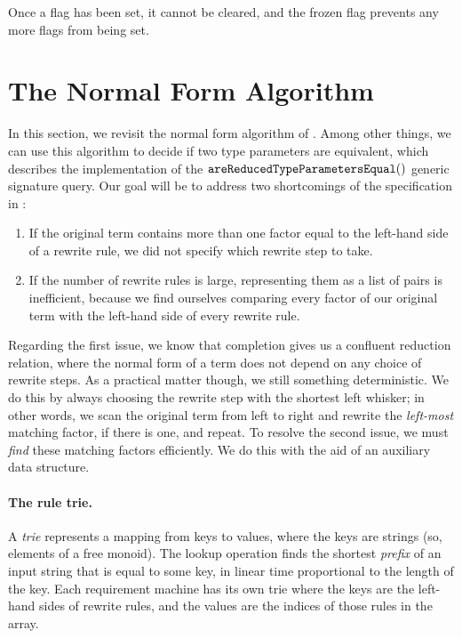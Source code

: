 \documentclass[../generics]{subfiles}
\begin{document}
Once a flag has been set, it cannot be cleared, and the frozen flag prevents any more flags from being set.

\section{The Normal Form Algorithm}\label{sec:rqm normal form}

In this section, we revisit the normal form algorithm of . Among other things, we can use this algorithm to decide if two type parameters are equivalent, which describes the implementation of the $\texttt{areReducedTypeParametersEqual}()$ generic signature query. Our goal will be to address two shortcomings of the specification in :
\begin{enumerate}
\item If the original term contains more than one factor equal to the left-hand side of a rewrite rule, we did not specify which rewrite step to take.

\item If the number of rewrite rules is large, representing them as a list of pairs is inefficient, because we find ourselves comparing every factor of our original term with the left-hand side of every rewrite rule.
\end{enumerate}
Regarding the first issue, we know that completion gives us a confluent reduction relation, where the normal form of a term does not depend on any choice of rewrite steps. As a practical matter though, we still something deterministic. We do this by always choosing the rewrite step with the shortest left whisker; in other words, we scan the original term from left to right and rewrite the \emph{left-most} matching factor, if there is one, and repeat. To resolve the second issue, we must \emph{find} these matching factors efficiently. We do this with the aid of an auxiliary data structure.

\paragraph{The rule trie.} A \emph{trie} represents a mapping from keys to values, where the keys are strings (so, elements of a free monoid). The lookup operation finds the shortest \emph{prefix} of an input string that is equal to some key, in linear time proportional to the length of the key. Each requirement machine has its own trie where the keys are the left-hand sides of rewrite rules, and the values are the indices of those rules in the array.
\end{document}
